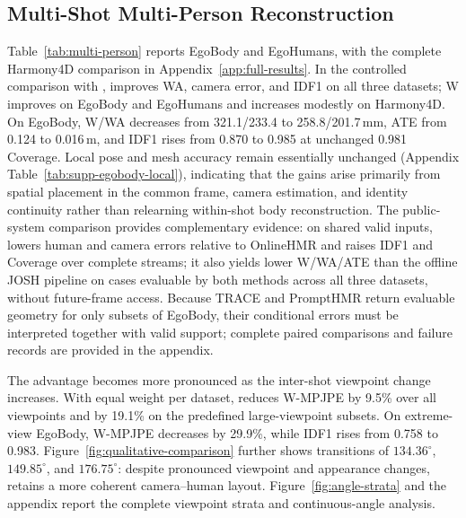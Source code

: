 \subsection{Multi-Shot Multi-Person Reconstruction}
\label{sec:main-results}



Table~\ref{tab:multi-person} reports EgoBody and EgoHumans, with the complete
Harmony4D comparison in Appendix~\ref{app:full-results}. In the controlled
comparison with \humanthree{}, \method{} improves WA, camera error, and IDF1
on all three datasets; W improves on EgoBody and EgoHumans and increases
modestly on Harmony4D. On EgoBody, W/WA decreases from 321.1/233.4 to
258.8/201.7\,mm, ATE from 0.124 to 0.016\,m, and IDF1 rises from 0.870 to
0.985 at unchanged 0.981 Coverage. Local pose and mesh accuracy remain
essentially unchanged (Appendix Table~\ref{tab:supp-egobody-local}), indicating
that the gains arise primarily from spatial placement in the common frame,
camera estimation, and identity continuity rather than relearning within-shot
body reconstruction. The public-system comparison provides complementary
evidence: on shared valid inputs, \method{} lowers human and camera errors
relative to OnlineHMR and raises IDF1 and Coverage over complete streams; it
also yields lower W/WA/ATE than the offline JOSH pipeline on cases evaluable by
both methods across all three datasets, without future-frame access. Because
TRACE and PromptHMR return evaluable geometry for only subsets of EgoBody,
their conditional errors must be interpreted together with valid support;
complete paired comparisons and failure records are provided in the appendix.

The advantage becomes more pronounced as the inter-shot viewpoint change
increases. With equal weight per dataset, \method{} reduces W-MPJPE by 9.5\%
over all viewpoints and by 19.1\% on the predefined large-viewpoint subsets.
On extreme-view EgoBody, W-MPJPE decreases by 29.9\%, while IDF1 rises from
0.758 to 0.983. Figure~\ref{fig:qualitative-comparison} further shows
transitions of $134.36^\circ$, $149.85^\circ$, and $176.75^\circ$: despite
pronounced viewpoint and appearance changes, \method{} retains a more
coherent camera--human layout. Figure~\ref{fig:angle-strata} and the appendix
report the complete viewpoint strata and continuous-angle analysis.

